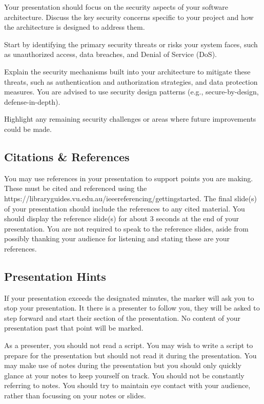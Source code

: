 \documentclass{csse4400}
\begin{document}
Your presentation should focus on the security aspects of your software architecture. Discuss the key security concerns specific to your project and how the architecture is designed to address them.

Start by identifying the primary security threats or risks your system faces, such as unauthorized access, data breaches, and Denial of Service (DoS).

Explain the security mechanisms built into your architecture to mitigate these threats, such as authentication and authorization strategies, and data protection measures.
You are advised to use security design patterns (e.g., secure-by-design, defense-in-depth).

Highlight any remaining security challenges or areas where future improvements could be made.



\subsection{Citations \& References}
You may use references in your presentation to support points you are making.
These must be cited and referenced using the 
{https://libraryguides.vu.edu.au/ieeereferencing/gettingstarted}.
The final slide(s) of your presentation should include the references to any cited material.
You should display the reference slide(s) for about 3 seconds at the end of your presentation.
You are not required to speak to the reference slides,
aside from possibly thanking your audience for listening and stating these are your references.


\subsection{Presentation Hints}

If your presentation exceeds the designated minutes, the marker will ask you to stop your presentation.
It there is a presenter to follow you, they will be asked to step forward and start their section of the presentation.
No content of your presentation past that point will be marked.

As a presenter, you should not read a script.
You may wish to write a script to prepare for the presentation but should not read it during the presentation.
You may make use of notes during the presentation but you should only quickly glance at your notes to keep yourself on track.
You should not be constantly referring to notes.
You should try to maintain eye contact with your audience, rather than focussing on your notes or slides.
\end{document}
